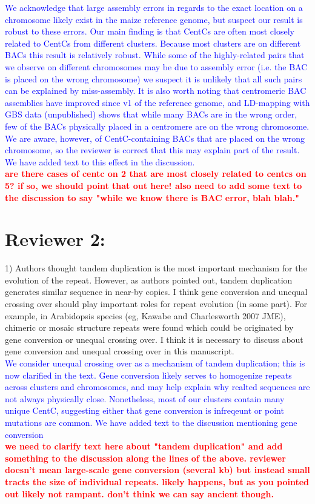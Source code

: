 \documentclass[]{article}
\newcommand{\res}[1]{\noindent \textcolor{blue}{{#1}} \\}
\newcommand{\jri}[1]{\textcolor{red}{{\bf #1}} }
\begin{document}
\res{We acknowledge that large assembly errors in regards to the exact location on a chromosome likely exist in the maize reference genome, but suspect our result is robust to these errors.
Our main finding is that CentCs are often most closely related to CentCs from different clusters.  Because most clusters are on different BACs this result is relatively robust. While some of the highly-related pairs that we observe on different chromosomes may be due to assembly error (i.e. the BAC is placed on the wrong chromosome) we suspect it is unlikely that all such pairs can be explained by miss-assembly.  It is also worth noting that centromeric BAC assemblies have improved since v1 of the reference genome, and LD-mapping with GBS data (unpublished) shows that while many BACs are in the wrong order, few of the BACs physically placed in a centromere are on the wrong chromosome. We are aware, however, of CentC-containing BACs that are placed on the wrong chromosome, so the reviewer is correct that this may explain part of the result.  We have added text to this effect in the discussion. } \jri{ are there cases of centc on 2 that are most closely related to centcs on 5? if so, we should point that out here!  also need to add some text to the discussion to say "while we know there is BAC error, blah blah." }

\section*{Reviewer 2:}

1) Authors thought tandem duplication is the most important mechanism for the evolution of the repeat. However, as authors pointed out, tandem duplication generates similar sequence in near-by copies. I think gene conversion and unequal crossing over should play important roles for repeat evolution (in some part). For example, in Arabidopsis species (eg, Kawabe and Charlesworth 2007 JME), chimeric or mosaic structure repeats were found which could be originated by gene conversion or unequal crossing over. I think it is necessary to discuss about gene conversion and unequal crossing over in this manuscript.\\

\res{We consider unequal crossing over as a mechanism of tandem duplication; this is now clarified in the text. Gene conversion likely serves to homogenize repeats across clusters and chromosomes, and may help explain why realted sequences are not always physically close.  Nonetheless, most of our clusters contain many unique CentC, suggesting either that gene conversion is infreqeunt or point mutations are common. We have added text to the discussion mentioning gene conversion} \jri{we need to clarify text here about "tandem duplication" and add something to the discussion along the lines of the above.  reviewer doesn't mean large-scale gene conversion (several kb) but instead small tracts the size of individual repeats.  likely happens, but as you pointed out likely not rampant.  don't think we can say ancient though.\\} 
\end{document}
